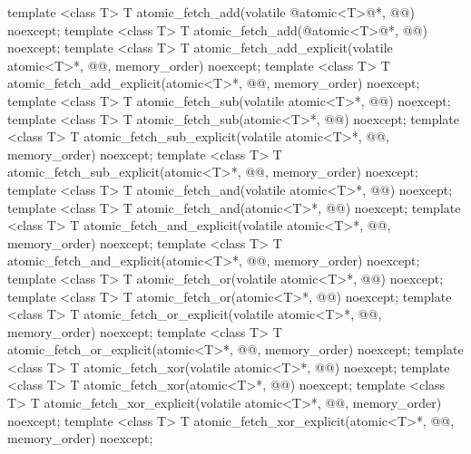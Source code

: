\begin{codeblock}
{  template <class T>
    T atomic_fetch_add(volatile @atomic<T>@*, @@) noexcept;
  template <class T>
    T atomic_fetch_add(@atomic<T>@*, @@) noexcept;
  template <class T>
    T atomic_fetch_add_explicit(volatile atomic<T>*, @@, memory_order) noexcept;
  template <class T>
    T atomic_fetch_add_explicit(atomic<T>*, @@, memory_order) noexcept;
  template <class T>
    T atomic_fetch_sub(volatile atomic<T>*, @@) noexcept;
  template <class T>
    T atomic_fetch_sub(atomic<T>*, @@) noexcept;
  template <class T>
    T atomic_fetch_sub_explicit(volatile atomic<T>*, @@, memory_order) noexcept;
  template <class T>
    T atomic_fetch_sub_explicit(atomic<T>*, @@, memory_order) noexcept;
  template <class T>
    T atomic_fetch_and(volatile atomic<T>*, @@) noexcept;
  template <class T>
    T atomic_fetch_and(atomic<T>*, @@) noexcept;
  template <class T>
    T atomic_fetch_and_explicit(volatile atomic<T>*, @@, memory_order) noexcept;
  template <class T>
    T atomic_fetch_and_explicit(atomic<T>*, @@, memory_order) noexcept;
  template <class T>
    T atomic_fetch_or(volatile atomic<T>*, @@) noexcept;
  template <class T>
    T atomic_fetch_or(atomic<T>*, @@) noexcept;
  template <class T>
    T atomic_fetch_or_explicit(volatile atomic<T>*, @@, memory_order) noexcept;
  template <class T>
    T atomic_fetch_or_explicit(atomic<T>*, @@, memory_order) noexcept;
  template <class T>
    T atomic_fetch_xor(volatile atomic<T>*, @@) noexcept;
  template <class T>
    T atomic_fetch_xor(atomic<T>*, @@) noexcept;
  template <class T>
    T atomic_fetch_xor_explicit(volatile atomic<T>*, @@, memory_order) noexcept;
  template <class T>
    T atomic_fetch_xor_explicit(atomic<T>*, @@, memory_order) noexcept;

}
\end{codeblock}
